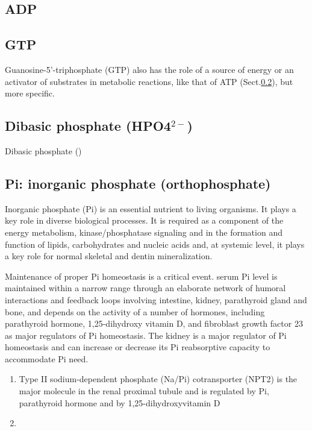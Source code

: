 \subsection{ADP}
\label{sec:ADP}

\subsection{GTP}
\label{sec:GTP}

Guanosine-5'-triphosphate (GTP) also has the role of a source of energy or an
activator of substrates in metabolic reactions, like that of ATP
(Sect.\ref{sec:GTP}), but more specific.

\subsection{Dibasic phosphate (HPO4$^{2-}$)}
\label{sec:dibasic-phosphate}

Dibasic  phosphate  ()



\subsection{Pi: inorganic phosphate (orthophosphate)}
\label{sec:inorganic-phosphate}
\label{sec:orthophosphate}
\label{sec:P_i}

Inorganic phosphate (Pi) is an essential nutrient to living organisms. It plays
a key role in diverse biological processes.
It is required as a component of the energy metabolism, kinase/phosphatase
signaling and in the formation and function of lipids, carbohydrates and nucleic
acids and, at systemic level, it plays a key role for normal skeletal and dentin
mineralization.

Maintenance of proper Pi homeostasis is a critical event.
serum Pi level is maintained within a narrow range through an elaborate network
of humoral interactions and feedback loops involving intestine, kidney,
parathyroid gland and bone, and depends on the activity of a number of hormones,
including parathyroid hormone, 1,25-dihydroxy vitamin D, and fibroblast growth
factor 23 as major regulators of Pi homeostasis. The kidney is a major regulator
of Pi homeostasis and can increase or decrease its Pi reabsorptive capacity to
accommodate Pi need.

\begin{enumerate}
  \item  Type II sodium-dependent phosphate (Na/Pi) cotransporter (NPT2) is the
  major molecule in the renal proximal tubule and is regulated by Pi,
  parathyroid hormone and by 1,25-dihydroxyvitamin D

  \item
\end{enumerate}

